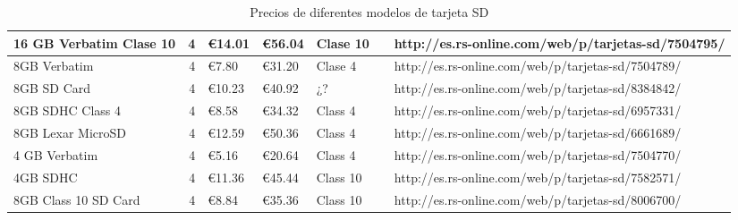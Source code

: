 \begin{landscape}
\begin{table}
\begin{tabular}{|l|r|l|l|l|p{3.5cm}|p{4.5cm}|}
\rowcolor{LightCyan}
16 GB Verbatim Clase 10&4&€14.01&€56.04&Clase 10&&http://es.rs-online.com/web/p/tarjetas-sd/7504795/\\
\hline
8GB Verbatim&4&€7.80&€31.20&Clase 4&&http://es.rs-online.com/web/p/tarjetas-sd/7504789/\\
\hline
8GB SD Card&4&€10.23&€40.92&¿?&&http://es.rs-online.com/web/p/tarjetas-sd/8384842/\\
\hline
8GB SDHC Class 4&4&€8.58&€34.32&Class 4&&http://es.rs-online.com/web/p/tarjetas-sd/6957331/\\
\hline
8GB Lexar MicroSD&4&€12.59&€50.36&Class 4&&http://es.rs-online.com/web/p/tarjetas-sd/6661689/\\
\hline
4 GB Verbatim&4&€5.16&€20.64&Class 4&&http://es.rs-online.com/web/p/tarjetas-sd/7504770/\\
\hline
4GB SDHC&4&€11.36&€45.44&Class 10&&http://es.rs-online.com/web/p/tarjetas-sd/7582571/\\
\hline
\rowcolor{LightCyan}
8GB Class 10 SD Card&4&€8.84&€35.36&Class 10&&http://es.rs-online.com/web/p/tarjetas-sd/8006700/\\
\hline
\end{tabular}
\caption{Precios de diferentes modelos de tarjeta SD}
\end{table}
\end{landscape}

